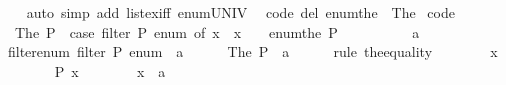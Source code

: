 \begin{isabellebody}
%
\isadelimproof
\ \ %
\endisadelimproof
%
\isatagproof
{}\isamarkupfalse%
\ {\isacharparenleft}{\kern0pt}auto\ simp\ add{\isacharcolon}{\kern0pt}\ list{\isacharunderscore}{\kern0pt}ex{}{\isacharunderscore}{\kern0pt}iff\ enum{\isacharunderscore}{\kern0pt}UNIV{\isacharparenright}{\kern0pt}%
\endisatagproof
{\isafoldproof}%
%
\isadelimproof
%
\endisadelimproof
%
\isadelimdocument
%
\endisadelimdocument
%
\isatagdocument
%
\isamarkuptrue%
%
\endisatagdocument
{\isafolddocument}%
%
\isadelimdocument
%
\endisadelimdocument
{}\isamarkupfalse%
\isanewline
\ \ {\isacharbrackleft}{\kern0pt}code\ del{\isacharbrackright}{\kern0pt}{\isacharcolon}{\kern0pt}\ {\isachardoublequoteopen}enum{\isacharunderscore}{\kern0pt}the\ {\isacharequal}{\kern0pt}\ The{\isachardoublequoteclose}\isanewline
\isanewline
{}\isamarkupfalse%
\ {\isacharbrackleft}{\kern0pt}code{\isacharbrackright}{\kern0pt}{\isacharcolon}{\kern0pt}\isanewline
\ \ {\isachardoublequoteopen}The\ P\ {\isacharequal}{\kern0pt}\ {\isacharparenleft}{\kern0pt}case\ filter\ P\ enum\ of\ {\isacharbrackleft}{\kern0pt}x{\isacharbrackright}{\kern0pt}\ {\isasymRightarrow}\ x\ {\isacharbar}{\kern0pt}\ {\isacharunderscore}{\kern0pt}\ {\isasymRightarrow}\ enum{\isacharunderscore}{\kern0pt}the\ P{\isacharparenright}{\kern0pt}{\isachardoublequoteclose}\isanewline
%
\isadelimproof
%
\endisadelimproof
%
\isatagproof
{}\isamarkupfalse%
\ {\isacharminus}{\kern0pt}\isanewline
\ \ \isacommand{{\isacharbraceleft}{\kern0pt}}\isamarkupfalse%
\isanewline
\ \ \ \ \isamarkupfalse%
\ a\isanewline
\ \ \ \ \isamarkupfalse%
\ filter{\isacharunderscore}{\kern0pt}enum{\isacharcolon}{\kern0pt}\ {\isachardoublequoteopen}filter\ P\ enum\ {\isacharequal}{\kern0pt}\ {\isacharbrackleft}{\kern0pt}a{\isacharbrackright}{\kern0pt}{\isachardoublequoteclose}\isanewline
\ \ \ \ \isamarkupfalse%
\ {\isachardoublequoteopen}The\ P\ {\isacharequal}{\kern0pt}\ a{\isachardoublequoteclose}\isanewline
\ \ \ \ \isamarkupfalse%
\ {\isacharparenleft}{\kern0pt}rule\ the{\isacharunderscore}{\kern0pt}equality{\isacharparenright}{\kern0pt}\isanewline
\ \ \ \ \ \ \isamarkupfalse%
\ x\isanewline
\ \ \ \ \ \ \isamarkupfalse%
\ {\isachardoublequoteopen}P\ x{\isachardoublequoteclose}\isanewline
\ \ \ \ \ \ \isamarkupfalse%
\ {\isachardoublequoteopen}x\ {\isacharequal}{\kern0pt}\ a{\isachardoublequoteclose}\isanewline
\ \ \ \ \ \ \isamarkupfalse%

\end{isabellebody}
